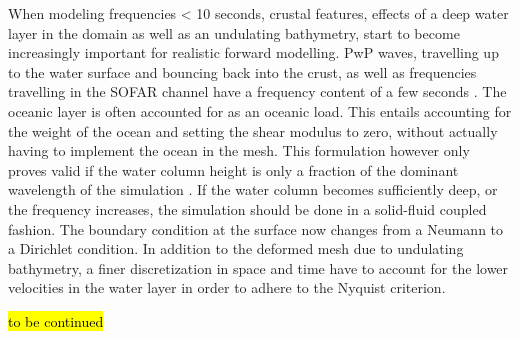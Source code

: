 \documentclass[../Text/00main.tex]{subfiles}
\begin{document}
When modeling frequencies < 10 seconds, crustal features, effects of a deep water layer in the domain as well as an undulating bathymetry, start to become increasingly important for realistic forward modelling. PwP waves, travelling up to the water surface and bouncing back into the crust, as well as frequencies travelling in the SOFAR channel have a frequency content of a few seconds \cite{fernando2020oceanic}. The oceanic layer is often accounted for as an oceanic load. This entails accounting for the weight of the ocean and setting the shear modulus to zero, without actually having to implement the ocean in the mesh. This formulation however only proves valid if the water column height is only a fraction of the dominant wavelength of the simulation \cite{komatitsch2002spectral}. If the water column becomes sufficiently deep, or the frequency increases, the simulation should be done in a solid-fluid coupled fashion. The boundary condition at the surface now changes from a Neumann to a Dirichlet condition. In addition to the deformed mesh due to undulating bathymetry, a finer discretization in space and time have to account for the lower velocities in the water layer in order to adhere to the Nyquist criterion. 

\hl{to be continued}






\end{document}

